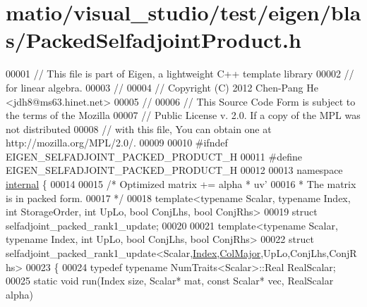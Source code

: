 \hypertarget{matio_2visual__studio_2test_2eigen_2blas_2_packed_selfadjoint_product_8h_source}{}\section{matio/visual\+\_\+studio/test/eigen/blas/\+Packed\+Selfadjoint\+Product.h}
\label{matio_2visual__studio_2test_2eigen_2blas_2_packed_selfadjoint_product_8h_source}

\begin{DoxyCode}
00001 \textcolor{comment}{// This file is part of Eigen, a lightweight C++ template library}
00002 \textcolor{comment}{// for linear algebra.}
00003 \textcolor{comment}{//}
00004 \textcolor{comment}{// Copyright (C) 2012 Chen-Pang He <jdh8@ms63.hinet.net>}
00005 \textcolor{comment}{//}
00006 \textcolor{comment}{// This Source Code Form is subject to the terms of the Mozilla}
00007 \textcolor{comment}{// Public License v. 2.0. If a copy of the MPL was not distributed}
00008 \textcolor{comment}{// with this file, You can obtain one at http://mozilla.org/MPL/2.0/.}
00009 
00010 \textcolor{preprocessor}{#ifndef EIGEN\_SELFADJOINT\_PACKED\_PRODUCT\_H}
00011 \textcolor{preprocessor}{#define EIGEN\_SELFADJOINT\_PACKED\_PRODUCT\_H}
00012 
00013 \textcolor{keyword}{namespace }\hyperlink{namespaceinternal}{internal} \{
00014 
00015 \textcolor{comment}{/* Optimized matrix += alpha * uv'}
00016 \textcolor{comment}{ * The matrix is in packed form.}
00017 \textcolor{comment}{ */}
00018 \textcolor{keyword}{template}<\textcolor{keyword}{typename} Scalar, \textcolor{keyword}{typename} Index, \textcolor{keywordtype}{int} StorageOrder, \textcolor{keywordtype}{int} UpLo, \textcolor{keywordtype}{bool} ConjLhs, \textcolor{keywordtype}{bool} ConjRhs>
00019 \textcolor{keyword}{struct }selfadjoint\_packed\_rank1\_update;
00020 
00021 \textcolor{keyword}{template}<\textcolor{keyword}{typename} Scalar, \textcolor{keyword}{typename} Index, \textcolor{keywordtype}{int} UpLo, \textcolor{keywordtype}{bool} ConjLhs, \textcolor{keywordtype}{bool} ConjRhs>
00022 \textcolor{keyword}{struct }selfadjoint\_packed\_rank1\_update<Scalar,\hyperlink{namespace_eigen_a62e77e0933482dafde8fe197d9a2cfde}{Index},\hyperlink{group__enums_ggaacded1a18ae58b0f554751f6cdf9eb13a0cbd4bdd0abcfc0224c5fcb5e4f6669a}{ColMajor},UpLo,ConjLhs,ConjRhs>
00023 \{
00024   \textcolor{keyword}{typedef} \textcolor{keyword}{typename} NumTraits<Scalar>::Real RealScalar;
00025   \textcolor{keyword}{static} \textcolor{keywordtype}{void} run(Index size, Scalar* mat, \textcolor{keyword}{const} Scalar* vec, RealScalar alpha)

\end{DoxyCode}
